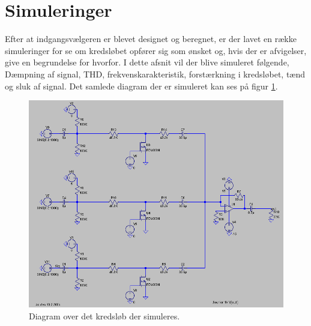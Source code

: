 \section{Simuleringer}
Efter at indgangsvælgeren er blevet designet og beregnet, er der lavet en række simuleringer for se om kredsløbet opfører sig som ønsket og, hvis der er afvigelser, give en begrundelse for hvorfor. I dette afsnit vil der blive simuleret følgende, Dæmpning af signal, THD, frekvenskarakteristik, forstærkning i kredsløbet, tænd og sluk af signal. Det samlede diagram der er simuleret kan ses på figur \ref{diagram_simulering}. 

\begin{figure}[h]
\centering
\includegraphics[scale=0.4]{teknisk/indgangsvaelger/simulering/indgangvaelger_ltspice_diagram.png}
\caption{Diagram over det kredsløb der simuleres.}
\label{diagram_simulering}
\end{figure}

